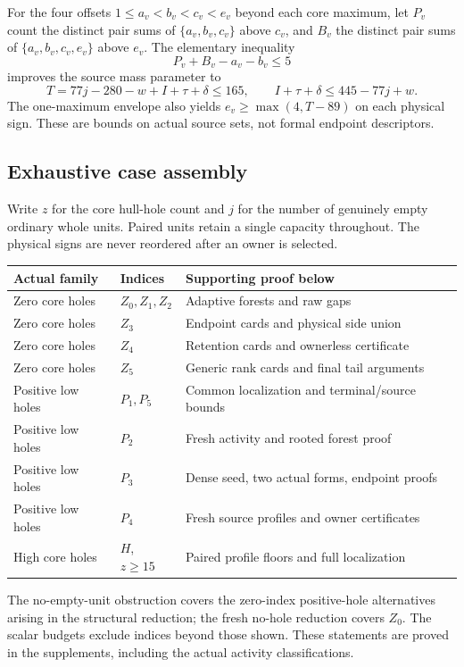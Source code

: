 For the four offsets $1\le a_v<b_v<c_v<e_v$ beyond each core maximum, let
$P_v$ count the distinct pair sums of $\{a_v,b_v,c_v\}$ above $c_v$, and
$B_v$ the distinct pair sums of $\{a_v,b_v,c_v,e_v\}$ above $e_v$. The
elementary inequality
\[
 P_v+B_v-a_v-b_v\le5
\]
improves the source mass parameter to
\[
 T=77j-280-w+I+\tau+\delta\le165,
 \qquad I+\tau+\delta\le445-77j+w.
\]
The one-maximum envelope also yields $e_v\ge\max(4,T-89)$ on each physical
sign. These are bounds on actual source sets, not formal endpoint descriptors.

\subsection{Exhaustive case assembly}
Write $z$ for the core hull-hole count and $j$ for the number of genuinely empty
ordinary whole units. Paired units retain a single capacity throughout. The
physical signs are never reordered after an owner is selected.

\begin{center}
\begin{tabular}{lll}
\toprule
Actual family & Indices & Supporting proof below\\
\midrule
Zero core holes & $Z_0,Z_1,Z_2$ & Adaptive forests and raw gaps\\
Zero core holes & $Z_3$ & Endpoint cards and physical side union\\
Zero core holes & $Z_4$ & Retention cards and ownerless certificate\\
Zero core holes & $Z_5$ & Generic rank cards and final tail arguments\\
Positive low holes & $P_1,P_5$ & Common localization and terminal/source bounds\\
Positive low holes & $P_2$ & Fresh activity and rooted forest proof\\
Positive low holes & $P_3$ & Dense seed, two actual forms, endpoint proofs\\
Positive low holes & $P_4$ & Fresh source profiles and owner certificates\\
High core holes & $H$, $z\ge15$ & Paired profile floors and full localization\\
\bottomrule
\end{tabular}
\end{center}
The no-empty-unit obstruction covers the zero-index positive-hole alternatives
arising in the structural reduction; the fresh no-hole reduction covers $Z_0$.
The scalar budgets exclude indices beyond those shown. These statements are
proved in the supplements, including the actual activity classifications.

